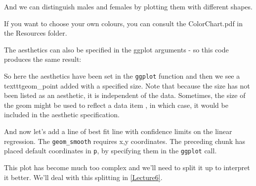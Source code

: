 \documentclass[titlepage]{book}\usepackage{knitr}
\begin{document}
And we can distinguish males and females by plotting them with different shapes.

\begin{knitrout}
\color{fgcolor}\begin{kframe}
\begin{alltt}
 \hlkwb{<-}  \hlopt{+}
  \hlstd{(}\hlstd{(}        \hlstd{=} \hlstd{)}
\end{alltt}
\end{kframe}
\end{knitrout}


If you want to choose your own colours, you can consult the ColorChart.pdf in the Resources folder.

The aesthetics can also be specified in the ggplot arguments - so this code produces the same result:

\begin{knitrout}
\color{fgcolor}\begin{kframe}
\begin{alltt}
 \hlkwb{<-}  \hlstd{(}         \hlopt{+}
  \hlstd{(}\hlstd{=}\hlstd{)}
\end{alltt}
\end{kframe}
\end{knitrout}
So here the aesthetics have been set in the \texttt{ggplot} function and then we see a texttt{geom\_point} added with a specified size. Note that because the size has not been listed as an aesthetic, it is independent of the data.  Sometimes, the size of the geom might be used to reflect a data item , in which case, it would be included in the aesthetic specification.

And now let's add a line of best fit line with confidence limits on the linear regression.
The \texttt{geom\_smooth} requires x,y coordinates.  The preceding chunk has placed default coordinates in \texttt{p}, by specifying them in the \texttt{ggplot} call. 
\begin{knitrout}
\color{fgcolor}\begin{kframe}
\begin{alltt}
 \hlkwb{<-}    \hlopt{+}
  \hlstd{(}  \hlstd{=} \hlstd{)}
\end{alltt}
\end{kframe}
\end{knitrout}
This plot has become much too complex and we'll need to split it up to interpret it better.  We'll deal with this splitting in \ref{Lecture6}.
\end{document}
